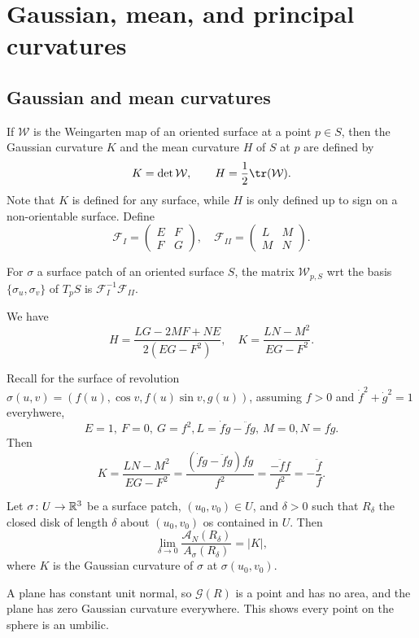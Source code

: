 \section{Gaussian, mean, and principal curvatures} 

\subsection{Gaussian and mean curvatures}
\begin{definition}[]
    If $\mathcal{W} $ is the Weingarten map of an oriented surface at a point $p \in S$, then the Gaussian curvature $K$ and the mean curvature $H$ of $S$ at $p$ are defined by \[
        K= \det \mathcal{W} ,\qquad H= \frac{1}{2}\tr (\mathcal{W} ).
    \] Note that $K$ is defined for any surface, while $H$ is only defined up to sign on a non-orientable surface. Define \[
    \mathcal{F} _I = 
    \begin{pmatrix}
        E & F \\ F & G
    \end{pmatrix},\quad \mathcal F_{II}=
    \begin{pmatrix}
        L & M \\ M & N
    \end{pmatrix}.
    \] 
\end{definition}
\begin{prop}
    For $\sigma$ a surface patch of an oriented surface $S$, the matrix $\mathcal{W} _{p,S}$ wrt the basis $\{\sigma_u,\sigma_v\} $ of $T_p S$ is $\mathcal{F}_I^{-1}\mathcal{F} _{II}$. 
\end{prop}
\begin{cor}
    We have \[
        H= \frac{LG-2MF+NE}{2(EG-F^2)},\quad K= \frac{LN-M^2}{EG-F^2}.
    \] 
\end{cor}
\begin{example}
    Recall for the surface of revolution $\sigma(u,v)=(f(u),\cos v, f(u) \sin v, g(u))$, assuming $f>0$ and $\dot f^2+\dot g^2=1$ everyhwere, \[
    E=1,\ F=0,\ G=f^2, L=\dot f \ddot g-\ddot f \dot g,\ M=0, N=f\dot g. 
    \] Then \[
    K= \frac{LN-M^2}{EG-F^2}= \frac{(\dot f\ddot g-\ddot f\dot g)f\dot g}{f^2}=\frac{-\ddot f f}{f^2}=- \frac{\ddot f}{f}.
    \] 
\end{example}
\begin{theorem}
    Let $\sigma\colon U \to \mathbb{R}^3$ be a surface patch, $(u_0,v_0) \in U$, and $\delta >0$ such that $R_{ \delta }$ the closed disk of length $\delta $ about $(u_0,v_0)$ os contained in $U$. Then \[
        \lim _{\delta  \to 0} \frac{\mathcal{A} _N(R_{\delta })}{A_{\sigma}(R_{\delta })}=|K|,
    \] where $K$ is the Gaussian curvature of $\sigma$ at $\sigma(u_0,v_0).$
\end{theorem}
\begin{example}
    A plane has constant unit normal, so $\mathcal{G} (R)$ is a point and has no area, and the plane has zero Gaussian curvature everywhere. This shows every point on the sphere is an umbilic.
\end{example}

